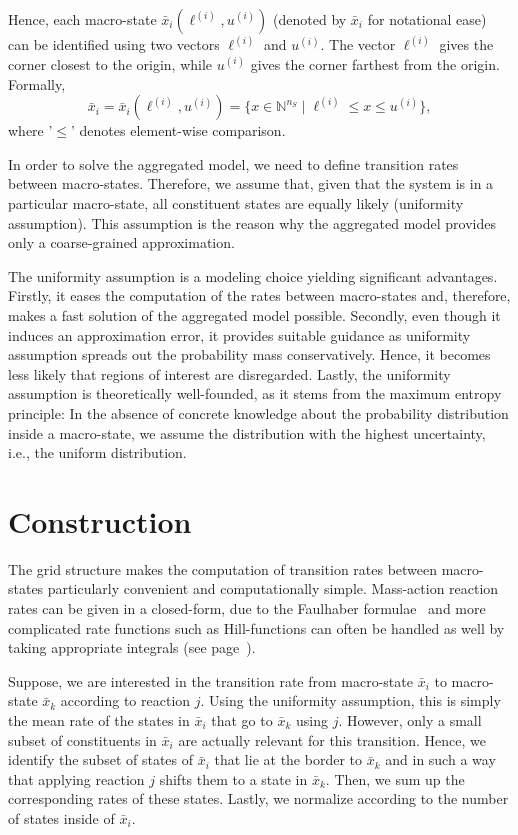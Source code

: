 Hence, each macro-state $\bar{x}_i(\ell^{(i)},u^{(i)})$ (denoted by
$\bar{x}_i$ for notational ease) can be identified using two vectors
$\ell^{(i)}$
and $u^{(i)}$.
The vector $\ell^{(i)}$ gives the corner closest to the origin, while $u^{(i)}$
gives the corner farthest from the origin.
Formally,
\begin{equation}\label{eq:macro_state}
  \bar{x}_i = \bar{x}_i(\ell^{(i)},u^{(i)}) =  \{x\in\mathbb{N}^{n_S}
  \mid  \ell^{(i)}  \leq x  \leq u^{(i)} \},
\end{equation}
where '$\leq$' denotes element-wise comparison.

In order to solve the aggregated model, we need to define transition
rates between macro-states.
Therefore, we assume that, given that the system is in a particular
macro-state, all constituent states are equally likely (uniformity assumption).
This assumption is the reason why the aggregated model provides only
a coarse-grained approximation.

The uniformity assumption is a modeling choice yielding significant advantages.
Firstly, it eases the computation of the rates between macro-states
and, therefore, makes a fast solution of the aggregated model possible.
Secondly, even though it induces an approximation error, it provides
suitable guidance as uniformity assumption spreads out the
probability mass conservatively.
Hence, it becomes less likely that regions of interest are disregarded.
Lastly, the uniformity assumption is theoretically well-founded, as
it stems from the maximum entropy principle:
In the absence of concrete knowledge about the probability
distribution inside a macro-state, we assume the distribution with
the highest uncertainty, i.e., the uniform distribution.

\section{Construction}
The grid structure makes the computation of transition rates between
macro-states particularly convenient and computationally simple.
Mass-action reaction rates can be given in a closed-form,
due to the Faulhaber formulae~\parencite{knuth1993johann} and more
complicated rate functions such as Hill-functions can often be
handled as well by taking appropriate integrals (see
page~\pageref{model:hill_toggle}).

Suppose, we are interested in the transition rate from macro-state
$\bar{x}_i$ to macro-state $\bar{x}_k$ according to reaction $j$.
Using the uniformity assumption, this is simply the mean rate of the
states in $\bar{x}_i$ that go to $\bar{x}_k$ using $j$.
However, only a small subset of constituents in $\bar{x}_i$ are
actually relevant for this transition.
Hence, we identify the subset of states of $\bar{x}_i$ that lie at
the border to $\bar{x}_k$ and in such a way that applying reaction
$j$ shifts them to a state in $\bar{x}_k$. Then, we sum up the
corresponding rates of these states. Lastly, we normalize according
to the number of states inside of $\bar{x}_i$.

